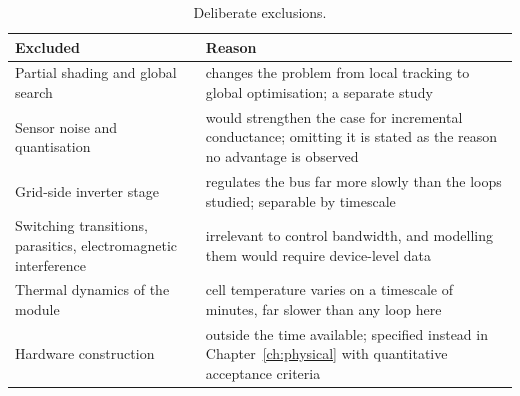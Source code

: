 \begin{table}[htbp]
\centering
\caption{Deliberate exclusions.}
\label{tab:exclusions}
\begin{tabular}{@{}L{0.30\textwidth}L{0.62\textwidth}@{}}
\toprule
\textbf{Excluded} & \textbf{Reason} \\
\midrule
Partial shading and global search & changes the problem from local tracking to global optimisation; a separate study \\
Sensor noise and quantisation & would strengthen the case for incremental conductance; omitting it is stated as the reason no advantage is observed \\
Grid-side inverter stage & regulates the bus far more slowly than the loops studied; separable by timescale \\
Switching transitions, parasitics, electromagnetic interference & irrelevant to control bandwidth, and modelling them would require device-level data \\
Thermal dynamics of the module & cell temperature varies on a timescale of minutes, far slower than any loop here \\
Hardware construction & outside the time available; specified instead in Chapter~\ref{ch:physical} with quantitative acceptance criteria \\
\bottomrule
\end{tabular}
\end{table}
